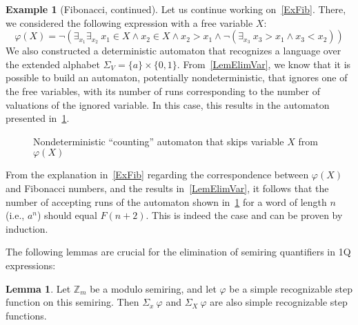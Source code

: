 \documentclass[12pt]{article}
\theoremstyle{definition}
\newtheorem{lemma}[theorem]{Lemma}
\newtheorem{example}{Example}[section]
\begin{document}
\begin{example}[Fibonacci, continued]
\label{ExFibCont}
    Let us continue working on~\cref{ExFib}. There, we considered the following expression with a free variable $X$:
    $$\varphi(X) = \neg(\exists_{x_1}\exists_{x_2} \ x_1 \in X \land x_2 \in X \land x_2 > x_1 \land \neg(\exists_{x_3} \ x_3 > x_1 \land x_3 < x_2 ))$$
    We also constructed a deterministic automaton that recognizes a language over the extended alphabet $\Sigma_V = \{a\} \times \{0,1\}$. From~\cref{LemElimVar}, we know that it is possible to build an automaton, potentially nondeterministic, that ignores one of the free variables, with its number of runs corresponding to the number of valuations of the ignored variable. In this case, this results in the automaton presented in~\cref{fig:my_label2}.

    \begin{figure}[ht]
        \centering
        \caption{Nondeterministic ``counting'' automaton that skips variable $X$ from $\varphi(X)$}
        \label{fig:my_label2}
    \end{figure}

    From the explanation in~\cref{ExFib} regarding the correspondence between $\varphi(X)$ and Fibonacci numbers, and the results in~\cref{LemElimVar}, it follows that the number of accepting runs of the automaton shown in~\cref{fig:my_label2} for a word of length $n$ (i.e., $a^n$) should equal $F(n+2)$. This is indeed the case and can be proven by induction.
\end{example}

The following lemmas are crucial for the elimination of semiring quantifiers in 1Q expressions:

\begin{lemma}
    \label{QuantElimAdd}
    Let $\mathbb{Z}_m$ be a modulo semiring, and let $\varphi$ be a simple recognizable step function on this semiring. Then $\Sigma_x \ \varphi$ and $\Sigma_X \ \varphi$ are also simple recognizable step functions.
\end{lemma}
\end{document}
